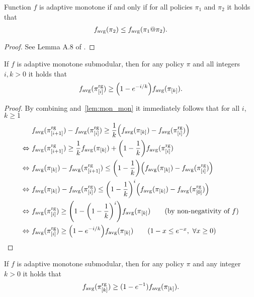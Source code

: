 \begin{lemma}\label{lem:mon_mon}
  Function $f$ is adaptive monotone if and only if for all policies $\pi_1$ and $\pi_2$ it holds that
  \begin{align*}
    f_{\mathrm{avg}}(\pi_2) \leq f_{\mathrm{avg}}(\pi_1 @ \pi_2).
  \end{align*}
\end{lemma}
\begin{proof}
See Lemma A.8 of \citet{golovin11}.
\end{proof}

\begin{theorem}
  If $f$ is adaptive monotone submodular, then for any policy $\pi$ and all integers $i, k > 0$ it holds that
  \begin{align*}
    \favg(\pigi) \geq \left(1 - e^{-i/k}\right)\favg(\pik).
  \end{align*}
\end{theorem}
\begin{proof}
  By combining  and~\ref{lem:mon_mon} it immediately follows that for all $i$, $k \geq 1$
  \begin{align*}
                   &\ \favg(\pigii) - \favg(\pigi) \geq \frac{1}{k}\left(\favg(\pik) - \favg(\pigi)\right)\\
    \Leftrightarrow&\ \favg(\pigii) \geq \frac{1}{k}\favg(\pik) + \left(1 - \frac{1}{k}\right) \favg(\pigi)\\
    \Leftrightarrow&\ \favg(\pik) - \favg(\pigii) \leq \left(1 - \frac{1}{k}\right)\left(\favg(\pik) - \favg(\pigi)\right)\\
    \Leftrightarrow&\ \favg(\pik) - \favg(\pigi) \leq \left(1 - \frac{1}{k}\right)^{i}\left(\favg(\pik) - \favg(\pigo)\right)\\
    \Leftrightarrow&\ \favg(\pigi) \geq \left(1 - \left(1 - \frac{1}{k}\right)^{i}\right)\favg(\pik)\tag*{(by non-negativity of $f$)}\\
    \Leftrightarrow&\ \favg(\pigi) \geq \left(1 - e^{-i/k}\right)\favg(\pik)\tag*{($1 - x \leq e^{-x},\ \forall x \geq 0$)}
  \end{align*}
\end{proof}

\begin{cor}
  If $f$ is adaptive monotone submodular, then for any policy $\pi$ and any integer $k > 0$ it holds that
  \begin{align*}
    f_{\mathrm{avg}}(\pi^{\textrm{rg}}_{[k]}) \geq (1 - e^{-1})f_{\mathrm{avg}}(\pi_{[k]}).
  \end{align*}
\end{cor}

